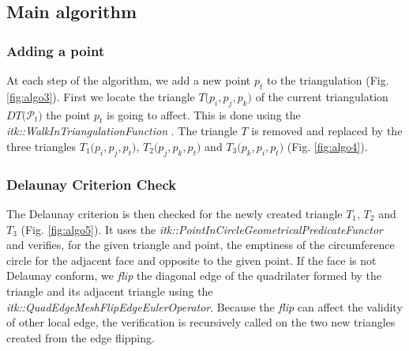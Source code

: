 \documentclass{InsightArticle}
\begin{document}
\subsection{Main algorithm}

\subsubsection{Adding a point}

At each step of the algorithm, we add a new point $\mathit{p_{t}}$ to the triangulation (Fig. \ref{fig:algo3}). First we locate the triangle $\mathit{T}(\mathit{p_{i}},\mathit{p_{j}},\mathit{p_{k})}$ of the current triangulation $\mathit{DT(}\mathcal{P}_{\mathit{t}}\mathit{)}$ the point $\mathit{p_{t}}$ is going to affect. This is done using the \emph{itk::WalkInTriangulationFunction} \cite{Rigaud2012}. The triangle $\mathit{T}$ is removed and replaced by the three triangles $\mathit{T}_{1}(\mathit{p_{i}},\mathit{p_{j}},\mathit{p_{t})}$, $\mathit{T}_{2}(\mathit{p_{j}},\mathit{p_{k}},\mathit{p_{t})}$ and $\mathit{T}_{3}(\mathit{p_{k}},\mathit{p_{i}},\mathit{p_{t})}$ (Fig. \ref{fig:algo4}).

\subsubsection{Delaunay Criterion Check}

The Delaunay criterion is then checked for the newly created triangle $\mathit{T}_{1}$, $\mathit{T}_{2}$ and $\mathit{T}_{3}$ (Fig. \ref{fig:algo5}). It uses the \emph{itk::PointInCircleGeometricalPredicateFunctor} \cite{Moreau2011} and verifies, for the given triangle and point, the emptiness of the circumference circle for the adjacent face and opposite to the given point. If the face is not Delaunay conform, we \emph{flip} the diagonal edge of the quadrilater formed by the triangle and its adjacent triangle using the \emph{itk::QuadEdgeMeshFlipEdgeEulerOperator}. Because the \emph{flip} can affect the validity of other local edge, the verification is recursively called on the two new triangles created from the edge flipping.
\end{document}
